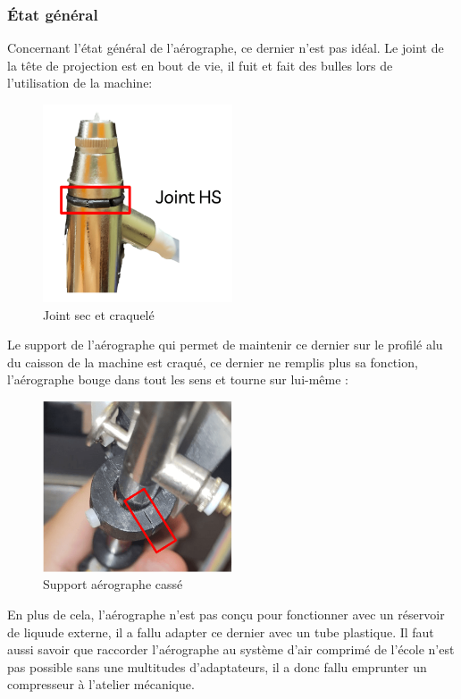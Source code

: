 \newpage
\subsubsection{État général}
Concernant l'état général de l'aérographe, ce dernier n'est pas idéal.
Le joint de la tête de projection est en bout de vie, il fuit et fait des bulles lors de l'utilisation de la machine:
\begin{figure}[H]
  \centering
  \includegraphics[width = 0.5\textwidth]{assets/figures/situation_initiale/joint_aerographe_HS.png}
  \caption{Joint sec et craquelé}
\end{figure}

Le support de l'aérographe qui permet de maintenir ce dernier sur le profilé alu du caisson de la machine est craqué,
ce dernier ne remplis plus sa fonction, l'aérographe bouge dans tout les sens et tourne sur lui-même :
\begin{figure}[H]
  \centering
  \includegraphics[width = 0.5\textwidth]{assets/figures/situation_initiale/support_aerographe_casse.png}
  \caption{Support aérographe cassé}
\end{figure}
En plus de cela, l'aérographe n'est pas conçu pour fonctionner avec un réservoir de liquude externe, il a fallu adapter ce dernier avec un tube plastique.
Il faut aussi savoir que raccorder l'aérographe au système d'air comprimé de l'école n'est pas possible sans une multitudes d'adaptateurs, il a donc fallu emprunter
un compresseur à l'atelier mécanique.

